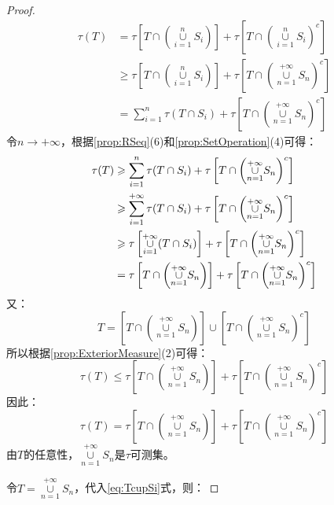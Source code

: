 \begin{proof}
	\begin{align*}
		\tau(T)&=\tau\left[T\cap\left(\underset{i=1}{\overset{n}{\cup}}S_i\right)\right]+\tau\left[T\cap\left(\underset{i=1}{\overset{n}{\cup}}S_i\right)^c\right] \\
		&\geqslant \tau\left[T\cap\left(\underset{i=1}{\overset{n}{\cup}}S_i\right)\right]+\tau\left[T\cap\left(\underset{n=1}{\overset{+\infty}{\cup}}S_n\right)^c\right] \\
		&=\sum_{i=1}^n\tau(T\cap S_i)+\tau\left[T\cap\left(\underset{n=1}{\overset{+\infty}{\cup}}S_n\right)^c\right]
	\end{align*}
	令$n\to+\infty$，根据\cref{prop:RSeq}(6)和\cref{prop:SetOperation}(4)可得：
	\begin{align}
		\tau(T)&\geqslant\sum_{i=1}^n\tau(T\cap S_i)+\tau\left[T\cap\left(\underset{n=1}{\overset{+\infty}{\cup}}S_n\right)^c\right]\notag \\
		&\geqslant\sum_{i=1}^{+\infty} \tau(T\cap S_i)+\tau\left[T\cap\left(\underset{n=1}{\overset{+\infty}{\cup}}S_n\right)^c\right] \label{eq:TcupSi}\\
		&\geqslant \tau\left[\underset{i=1}{\overset{+\infty}{\cup}}(T\cap S_i)\right]+\tau\left[T\cap\left(\underset{n=1}{\overset{+\infty}{\cup}}S_n\right)^c\right] \notag \\ &=\tau\left[T\cap\left(\underset{n=1}{\overset{+\infty}{\cup}}S_n\right)\right]+\tau\left[T\cap\left(\underset{n=1}{\overset{+\infty}{\cup}}S_n\right)^c\right]\notag
	\end{align}
	又：
	\begin{equation*}
		T=\left[T\cap\left(\underset{n=1}{\overset{+\infty}{\cup}}S_n\right)\right]\cup\left[T\cap\left(\underset{n=1}{\overset{+\infty}{\cup}}S_n\right)^c\right]
	\end{equation*}
	所以根据\cref{prop:ExteriorMeasure}(2)可得：
	\begin{equation*}
		\tau(T)\leqslant \tau\left[T\cap\left(\underset{n=1}{\overset{+\infty}{\cup}}S_n\right)\right]+\tau\left[T\cap\left(\underset{n=1}{\overset{+\infty}{\cup}}S_n\right)^c\right]
	\end{equation*}
	因此：
	\begin{equation*}
		\tau(T)= \tau\left[T\cap\left(\underset{n=1}{\overset{+\infty}{\cup}}S_n\right)\right]+\tau\left[T\cap\left(\underset{n=1}{\overset{+\infty}{\cup}}S_n\right)^c\right]
	\end{equation*}
	由$T$的任意性，$\underset{n=1}{\overset{+\infty}{\cup}}S_n$是$\tau$可测集。\par
	令$T=\underset{n=1}{\overset{+\infty}{\cup}}S_n$，代入\cref{eq:TcupSi}式，则：

\end{proof}
